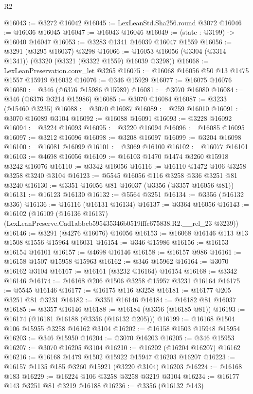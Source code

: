 \begin{lexlean}{R2}
\begin{coremodule}
@16043 := @3272 @16042
@16045 := LexLeanStd.Sha256.round @3072
@16046 := @16036 @16045
@16047 := @16043 @16046
@16049 := (state : @3199) -> @16040 @16047
@16053 := @3283 @1341 @16039 @16047 @1559
@16056 := @3291 (@3295 @16037) @3298
@16066 := @16053 @16056 (@3304 (@3314 @1341)) (@3320 (@3321 (@3322 @1559) @16039 @3298))
@16068 := LexLeanPreservation.conv_let @3265
@16075 := @16068 @16056 @50 @13 @1475 @1557 @15919 @16032
@16076 := @346 @15929
@16077 := @16075 @16076
@16080 := @346 (@6376 @15986 @15989)
@16081 := @3070 @16080
@16084 := @346 (@6376 @3214 @15986)
@16085 := @3070 @16084
@16087 := @3233 (@15460 @3235)
@16088 := @3070 @16087
@16089 := @259 @16010
@16091 := @3070 @16089 @3104
@16092 := @16088 @16091
@16093 := @3228 @16092
@16094 := @3224 @16093
@16095 := @3220 @16094
@16096 := @16085 @16095
@16097 := @3212 @16096
@16098 := @3208 @16097
@16099 := @3204 @16098
@16100 := @16081 @16099
@16101 := @3069 @16100
@16102 := @16077 @16101
@16103 := @4698 @16056
@16109 := @16103 @1470 @1474 @3260 @15918 @3242 @16076
@16110 := @3342 @16056
@16116 := @16110 @1472 @106 @3258 @3258 @3240 @3104
@16123 := @5545 @16056 @116 @3258 @336 @3251 @81 @3240
@16130 := @3351 @16056 @81 @16037 (@3356 (@3357 @16056 @81))
@16131 := @16123 @16130
@16132 := @5564 @3251
@16134 := @3356 (@16132 @336)
@16136 := @16116 (@16131 @16134)
@16137 := @3364 @16056
@16143 := @16102
    (@16109 (@16136 @16137) (LexLeanPreserve.Cad1abbcb595435346b0519fffc675838.R2.__rel_23 @3239))
@16146 := @3291 (@4276 @16076) @16056
@16153 := @16068 @16146 @113 @13 @1508 @1556 @15964 @16031
@16154 := @346 @15986
@16156 := @16153 @16154 @16101
@16157 := @4698 @16146
@16158 := @16157 @986
@16161 := @16158 @1507 @15958 @15963
@16162 := @346 @15962
@16164 := @3070 @16162 @3104
@16167 := @16161 (@3232 @16164) @16154
@16168 := @3342 @16146
@16174 := @16168 @206 @1506 @3258 @15957 @3231 @16164
@16175 := @5545 @16146
@16177 := @16175 @116 @3258
@16181 := @16177 @205 @3251 @81 @3231
@16182 := @3351 @16146
@16184 := @16182 @81 @16037
@16185 := @3357 @16146
@16188 := @16184 (@3356 (@16185 @81))
@16193 := @16174 (@16181 @16188 (@3356 (@16132 @205)))
@16199 := @16168 @1504 @106 @15955 @3258 @16162 @3104
@16202 := @16158 @1503 @15948 @15954
@16203 := @346 @15950
@16204 := @3070 @16203
@16205 := @346 @15953
@16207 := @3070 @16205 @3104
@16210 := @16202 (@16204 @16207) @16162
@16216 := @16168 @1479 @1502 @15922 @15947 @16203 @16207
@16223 := @16157 @1135 @185 @3260 @15921 (@3220 @3104) @16203
@16224 := @16168 @183
@16229 := @16224 @106 @3258 @3258 @3219 @3104
@16234 := @16177 @143 @3251 @81 @3219 @16188
@16236 := @3356 (@16132 @143)

\end{coremodule}
\end{lexlean}
